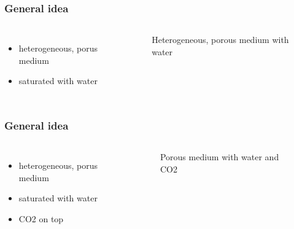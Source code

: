 \begin{frame}
	\frametitle{General idea}
	
	\begin{columns}[t]
		\column{5cm}
		\vspace{1cm}
		\begin{itemize}
		  \item heterogeneous, porus medium
		  \item saturated with water
		\end{itemize}
    
		\column{5cm}
		\begin{figure}
		  \centering
		  \caption{Heterogeneous, porous medium with water}
		\end{figure}
      \end{columns}
\end{frame}

\begin{frame}
	\frametitle{General idea}
	
	\begin{columns}[t]
		\column{5cm}
		\vspace{1cm}
		\begin{itemize}
		  \item heterogeneous, porus medium
		  \item saturated with water
		  \item CO2 on top
		\end{itemize}
		
		\column{5cm}
		\begin{figure}
		  \centering
		  \caption{Porous medium with water and CO2}
		\end{figure}
      \end{columns}
\end{frame}

